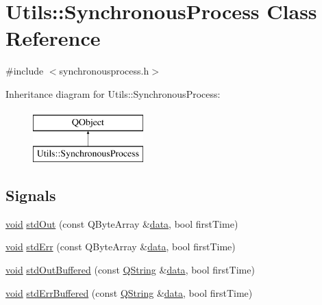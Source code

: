 \hypertarget{class_utils_1_1_synchronous_process}{\section{Utils\-:\-:Synchronous\-Process Class Reference}
\label{class_utils_1_1_synchronous_process}
}


{\ttfamily \#include $<$synchronousprocess.\-h$>$}

Inheritance diagram for Utils\-:\-:Synchronous\-Process\-:\begin{figure}[H]
\begin{center}
\leavevmode
\includegraphics[height=2.000000cm]{class_utils_1_1_synchronous_process}
\end{center}
\end{figure}
\subsection*{Signals}
\begin{DoxyCompactItemize}
\item 
\hyperlink{group___u_a_v_objects_plugin_ga444cf2ff3f0ecbe028adce838d373f5c}{void} \hyperlink{class_utils_1_1_synchronous_process_a028c3f124eda0ff36f4b3a2646356dc2}{std\-Out} (const Q\-Byte\-Array \&\hyperlink{glext_8h_a8850df0785e6fbcc2351af3b686b8c7a}{data}, bool first\-Time)
\item 
\hyperlink{group___u_a_v_objects_plugin_ga444cf2ff3f0ecbe028adce838d373f5c}{void} \hyperlink{class_utils_1_1_synchronous_process_ac385711ccc6eba25bab089c0e41bc52f}{std\-Err} (const Q\-Byte\-Array \&\hyperlink{glext_8h_a8850df0785e6fbcc2351af3b686b8c7a}{data}, bool first\-Time)
\item 
\hyperlink{group___u_a_v_objects_plugin_ga444cf2ff3f0ecbe028adce838d373f5c}{void} \hyperlink{class_utils_1_1_synchronous_process_a2508ede68c740f8b3565609dbd5c0782}{std\-Out\-Buffered} (const \hyperlink{group___u_a_v_objects_plugin_gab9d252f49c333c94a72f97ce3105a32d}{Q\-String} \&\hyperlink{glext_8h_a8850df0785e6fbcc2351af3b686b8c7a}{data}, bool first\-Time)
\item 
\hyperlink{group___u_a_v_objects_plugin_ga444cf2ff3f0ecbe028adce838d373f5c}{void} \hyperlink{class_utils_1_1_synchronous_process_a2534bbff80651365f5554772a57838dc}{std\-Err\-Buffered} (const \hyperlink{group___u_a_v_objects_plugin_gab9d252f49c333c94a72f97ce3105a32d}{Q\-String} \&\hyperlink{glext_8h_a8850df0785e6fbcc2351af3b686b8c7a}{data}, bool first\-Time)
\end{DoxyCompactItemize}
